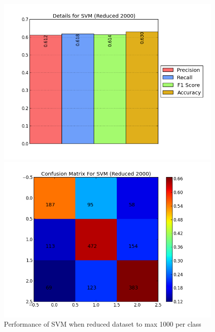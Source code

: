 \begin{figure}[htb]
	\centering
	\begin{minipage}{.45\linewidth}
		\includegraphics[width=\linewidth]{../img/plots/analysis/svm_stats_best_reduced_2000.png}
	\end{minipage}
	\hspace{0.05\linewidth}
	\begin{minipage}{.45\linewidth}
		\includegraphics[width=\linewidth]{../img/plots/analysis/svm_confusion_matrix_best_reduced_2000.png}
	\end{minipage}
	\label{fig:svm_reduced_2000}
	\caption[Performance of SVM when reduced dataset to max 2000 per class]{Performance of SVM when reduced dataset to max 1000 per class}
\end{figure}
